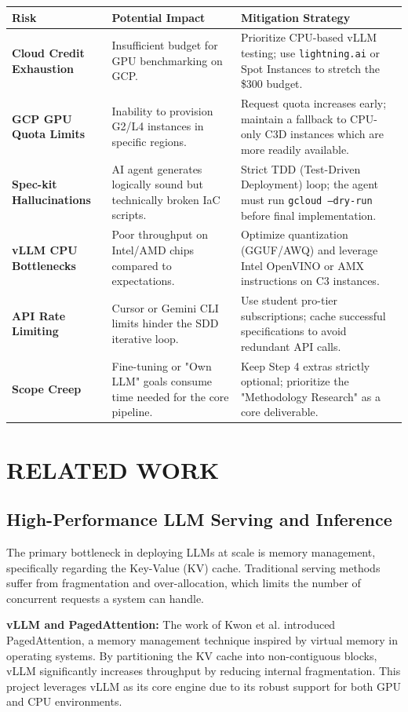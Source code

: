 \documentclass[a4paper,12pt]{report}
\begin{document}
\begin{longtable}{|p{3cm}|p{5cm}|p{5cm}|} \hline
\textbf{Risk} & \textbf{Potential Impact} & \textbf{Mitigation Strategy} \\ \hline
\textbf{Cloud Credit Exhaustion} & Insufficient budget for GPU benchmarking on GCP. & Prioritize CPU-based vLLM testing; use \texttt{lightning.ai} or Spot Instances to stretch the \$300 budget. \\ \hline
\textbf{GCP GPU Quota Limits} & Inability to provision G2/L4 instances in specific regions. & Request quota increases early; maintain a fallback to CPU-only C3D instances which are more readily available. \\ \hline
\textbf{Spec-kit Hallucinations} & AI agent generates logically sound but technically broken IaC scripts. & Strict TDD (Test-Driven Deployment) loop; the agent must run \texttt{gcloud --dry-run} before final implementation. \\ \hline
\textbf{vLLM CPU Bottlenecks} & Poor throughput on Intel/AMD chips compared to expectations. & Optimize quantization (GGUF/AWQ) and leverage Intel OpenVINO or AMX instructions on C3 instances. \\ \hline
\textbf{API Rate Limiting} & Cursor or Gemini CLI limits hinder the SDD iterative loop. & Use student pro-tier subscriptions; cache successful specifications to avoid redundant API calls. \\ \hline
\textbf{Scope Creep} & Fine-tuning or "Own LLM" goals consume time needed for the core pipeline. & Keep Step 4 extras strictly optional; prioritize the "Methodology Research" as a core deliverable. \\ \hline
\end{longtable}
\chapter{RELATED WORK}
\section{High-Performance LLM Serving and Inference}
The primary bottleneck in deploying LLMs at scale is memory management, specifically regarding the Key-Value (KV) cache. Traditional serving methods suffer from fragmentation and over-allocation, which limits the number of concurrent requests a system can handle.

\textbf{vLLM and PagedAttention:} The work of Kwon et al. \cite{vllm_paper} introduced PagedAttention, a memory management technique inspired by virtual memory in operating systems. By partitioning the KV cache into non-contiguous blocks, vLLM \cite{vllm_repo} significantly increases throughput by reducing internal fragmentation. This project leverages vLLM as its core engine due to its robust support for both GPU and CPU environments.
\end{document}
